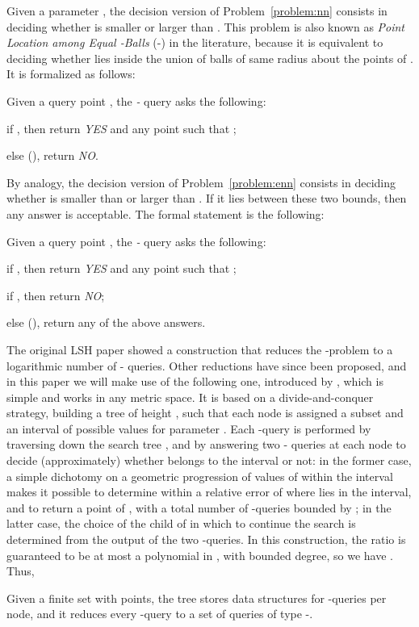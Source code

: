 Given a parameter , the decision version of
Problem~\ref{problem:nn} consists in deciding whether  is
smaller or larger than . This problem is also known as {\em Point
  Location among Equal -Balls} (-\pleb) in the literature, because
it is equivalent to deciding whether  lies inside the union of
balls of same radius  about the points of . It is
formalized as follows:
\begin{problem}[-\pleb] \label{problem:pleb}
  Given a query point , the {\em -\pleb} query asks
  the following:
  \begin{slist}
  \item[] if , then return {\em
    YES} and any point  such that ;
  \item[] else {\rm ()}, return {\em NO}.
  \end{slist}
\end{problem}
By analogy, the decision version of Problem~\ref{problem:enn} consists
in deciding whether  is smaller than  or larger than
. If it lies between these two bounds, then any answer is
acceptable.  The formal statement is the following:
\begin{problem}[-\pleb] \label{problem:epleb}
  Given a query point , the
  {\em -\pleb}  query asks the following:
  \begin{slist}
  \item[] if , then return {\em
    YES} and any point  such that ;
  \item[] if , then return {\em NO};
  \item[] else {\rm ()},
    return any of the above answers.
  \end{slist}
\end{problem}


The original LSH paper \citep{IM98} showed a construction that reduces
the -\nn problem to a logarithmic number of -\pleb
queries. Other reductions have since been proposed, and in this paper
we will make use of the following one, introduced by \citet{HarPeled01},
which is simple and works in any metric space. It is based on
a divide-and-conquer strategy, building a tree  of height
, such that each node  is assigned a subset
 and an interval  of possible values for
parameter .  Each -\nn query is performed by traversing down
the search tree , and by answering two -\pleb
queries at each node  to decide (approximately) whether
 belongs to the interval  or not: in the
former case, a simple dichotomy on a geometric progression of values
of  within the interval makes it possible to determine within a
relative error of  where  lies in the interval, and
to return a point of , with a total number of -\pleb queries bounded by ;
in the latter case, the choice of the child of  in which to
continue the search is determined from the output of the two -\pleb queries. In this construction, the ratio 
is guaranteed to be at most a polynomial in , with
bounded degree, so we have .  Thus,
\begin{thm} \label{thm:cnn} 
Given a finite set  with  points, the tree 
stores  data structures for
-\pleb queries per node, and it reduces every -\nn query
to a set of  queries of type
-\pleb.
 \end{thm}

